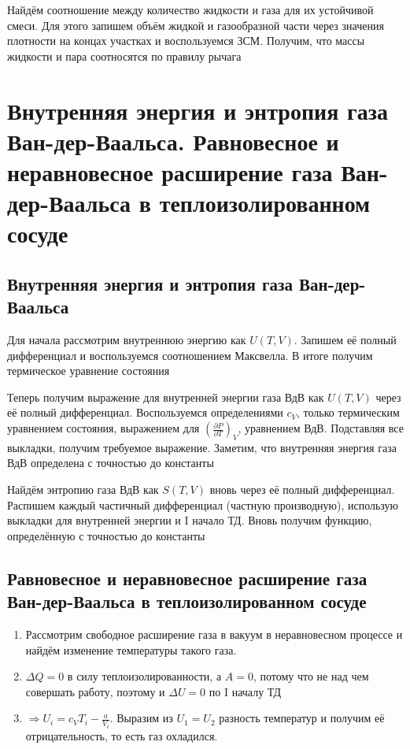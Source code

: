\documentclass[a4paper, 14pt]{article}
\begin{document}
    Найдём соотношение между количество жидкости и газа для их устойчивой смеси.
    Для этого запишем объём жидкой и газообразной части через значения плотности на концах участках и воспользуемся ЗСМ.
    Получим, что массы жидкости и пара соотносятся по правилу рычага

    \section{Внутренняя энергия и энтропия газа Ван-дер-Ваальса.
    Равновесное и неравновесное расширение газа Ван-дер-Ваальса в теплоизолированном сосуде}

    \subsection{Внутренняя энергия и энтропия газа Ван-дер-Ваальса}

    Для начала рассмотрим внутреннюю энергию как $U(T, V)$.
    Запишем её полный дифференциал и воспользуемся соотношением Максвелла.
    В итоге получим термическое уравнение состояния

    Теперь получим выражение для внутренней энергии газа ВдВ как $U(T, V)$ через её полный дифференциал.
    Воспользуемся определениями $c_V$, только термическим уравнением состояния, выражением для $(\frac{\partial P}{
        \partial T})_V$, уравнением ВдВ.
    Подставляя все выкладки, получим требуемое выражение.
    Заметим, что внутренняя энергия газа ВдВ определена с точностью до константы

    Найдём энтропию газа ВдВ как $S(T, V)$ вновь через её полный дифференциал.
    Распишем каждый частичный дифференциал (частную производную), использую выкладки для внутренней энергии и I
    начало ТД.
    Вновь получим функцию, определённую с точностью до константы

    \subsection{Равновесное и неравновесное расширение газа Ван-дер-Ваальса в теплоизолированном сосуде}

    \begin{enumerate}
        \item Рассмотрим свободное расширение газа в вакуум в неравновесном процессе и найдём изменение температуры
        такого газа.
        \item $\Delta Q = 0$ в силу теплоизолированности, а $A = 0$, потому что не над чем совершать работу, поэтому
        и $\Delta U = 0$ по I началу ТД
        \item $\Rightarrow U_i = c_V T_i - \frac{a}{V_i}$.
        Выразим из $U_1 = U_2$ разность температур и получим её отрицательность, то есть газ охладился.
    \end{enumerate}
\end{document}
